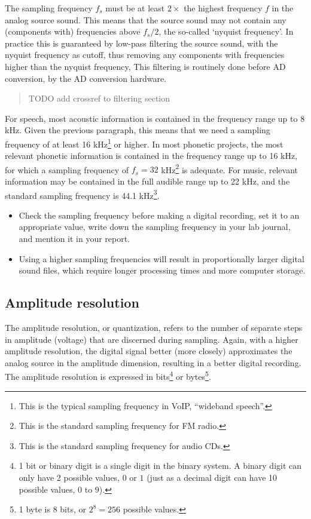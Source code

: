 \documentclass[
]{book}
\begin{document}
\label{nyquist}
The sampling frequency \(f_s\) must be at least \(2 \times\) the highest frequency \(f\) in the analog source sound. This means that the source sound may not contain any (components with) frequencies above \(f_s / 2\), the so-called `nyquist frequency'. In practice this is guaranteed by low-pass filtering the source sound, with the nyquist frequency as cutoff, thus removing any components with frequencies higher than the nyquist frequency, This filtering is routinely done before AD conversion, by the AD conversion hardware.

\begin{quote}
TODO add crossref to filtering section
\end{quote}

For speech, most acoustic information is contained in the frequency range up to 8 kHz. Given the previous paragraph, this means that we need a sampling frequency of at least 16 kHz\footnote{This is the typical sampling frequency in VoIP, ``wideband speech''.} or higher. In most phonetic projects, the most relevant phonetic information is contained in the frequency range up to 16 kHz, for which a sampling frequency of \(f_s = 32\) kHz\footnote{This is the standard sampling frequency for FM radio.} is adequate.
For music, relevant information may be contained in the full audible range up to 22 kHz, and the standard sampling frequency is 44.1 kHz\footnote{This is the standard sampling frequency for audio CDs.}.

\begin{itemize}
\item
  Check the sampling frequency before making a digital recording, set it to an appropriate value, write down the sampling frequency in your lab journal, and mention it in your report.
\item
  Using a higher sampling frequencies will result in proportionally larger digital sound files, which require longer processing times and more computer storage.
\end{itemize}

\subsection{Amplitude resolution}\label{amplitude-resolution}

The amplitude resolution, or quantization, refers to the number of separate steps in amplitude (voltage) that are discerned during sampling. Again, with a higher amplitude resolution, the digital signal better (more closely) approximates the analog source in the amplitude dimension, resulting in a better digital recording. The amplitude resolution is expressed in bits\footnote{1 bit or binary digit is a single digit in the binary system. A binary digit can only have 2 possible values, \(0\) or \(1\) (just as a decimal digit can have 10 possible values, \(0\) to \(9\)).} or bytes\footnote{1 byte is 8 bits, or \(2^8=256\) possible values.}.
\end{document}
